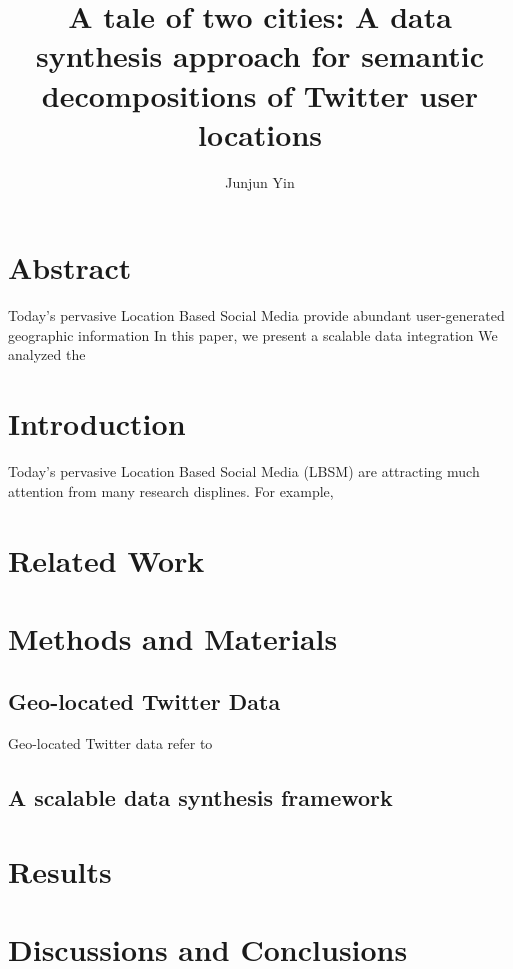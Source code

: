 \documentclass[a4paper,11pt]{article}
\begin{document}
\title{A tale of two cities: A data synthesis approach for semantic decompositions of Twitter user locations}
\author[1~\thanks{yinjunjun@gmail.com}]{Junjun Yin}
\renewcommand\Authands{ and }
\maketitle

\section*{Abstract}

Today's pervasive Location Based Social Media provide abundant user-generated geographic information
In this paper, we present a scalable data integration 
We analyzed the 



\section{Introduction}
Today's pervasive Location Based Social Media (LBSM) are attracting much attention from many research displines. For example,  



\section{Related Work}



\section{Methods and Materials}
\subsection{Geo-located Twitter Data}
Geo-located Twitter data refer to  


\subsection{A scalable data synthesis framework}



\section{Results}


\section{Discussions and Conclusions}
\end{document}
